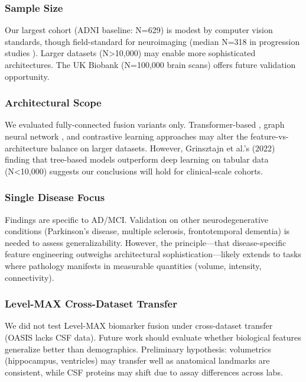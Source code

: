 \documentclass[conference]{IEEEtran}
\begin{document}
\subsubsection{Sample Size}

Our largest cohort (ADNI baseline: N=629) is modest by computer vision standards, though field-standard for neuroimaging (median N=318 in progression studies \cite{Venugopalan2021}). Larger datasets (N>10,000) may enable more sophisticated architectures. The UK Biobank (N=100,000 brain scans) \cite{Sudlow2015} offers future validation opportunity.

\subsubsection{Architectural Scope}

We evaluated fully-connected fusion variants only. Transformer-based \cite{Dosovitskiy2021}, graph neural network \cite{Ktena2017}, and contrastive learning \cite{Chen2020} approaches may alter the feature-vs-architecture balance on larger datasets. However, Grinsztajn et al.'s (2022) finding that tree-based models outperform deep learning on tabular data (N<10,000) \cite{Grinsztajn2022} suggests our conclusions will hold for clinical-scale cohorts.

\subsubsection{Single Disease Focus}

Findings are specific to AD/MCI. Validation on other neurodegenerative conditions (Parkinson's disease, multiple sclerosis, frontotemporal dementia) is needed to assess generalizability. However, the principle—that disease-specific feature engineering outweighs architectural sophistication—likely extends to tasks where pathology manifests in measurable quantities (volume, intensity, connectivity).

\subsubsection{Level-MAX Cross-Dataset Transfer}

We did not test Level-MAX biomarker fusion under cross-dataset transfer (OASIS lacks CSF data). Future work should evaluate whether biological features generalize better than demographics. Preliminary hypothesis: volumetrics (hippocampus, ventricles) may transfer well as anatomical landmarks are consistent, while CSF proteins may shift due to assay differences across labs.
\end{document}
